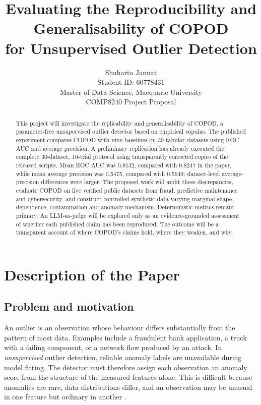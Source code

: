 \documentclass[11pt,a4paper,twocolumn]{article}
\title{\vspace{-1.2em}\textbf{Evaluating the Reproducibility and Generalisability of COPOD}\\
\textbf{for Unsupervised Outlier Detection}}
\author{Shuharto Jannat\\
Student ID: 60778431\\
Master of Data Science, Macquarie University\\
COMP8240 Project Proposal}
\date{}
\begin{document}
\maketitle
\vspace{-1.5em}

\begin{abstract}
This project will investigate the replicability and generalisability of COPOD, a parameter-free unsupervised outlier detector based on empirical copulas. The published experiment compares COPOD with nine baselines on 30 tabular datasets using ROC AUC and average precision. A preliminary replication has already executed the complete 30-dataset, 10-trial protocol using transparently corrected copies of the released scripts. Mean ROC AUC was 0.8132, compared with 0.8247 in the paper, while mean average precision was 0.5475, compared with 0.5649; dataset-level average-precision differences were larger. The proposed work will audit these discrepancies, evaluate COPOD on five verified public datasets from fraud, predictive maintenance and cybersecurity, and construct controlled synthetic data varying marginal shape, dependence, contamination and anomaly mechanism. Deterministic metrics remain primary. An LLM-as-judge will be explored only as an evidence-grounded assessment of whether each published claim has been reproduced. The outcome will be a transparent account of where COPOD's claims hold, where they weaken, and why.
\end{abstract}

\section{Description of the Paper}
\subsection{Problem and motivation}

An outlier is an observation whose behaviour differs substantially from the pattern of most data. Examples include a fraudulent bank application, a truck with a failing component, or a network flow produced by an attack. In \emph{unsupervised} outlier detection, reliable anomaly labels are unavailable during model fitting. The detector must therefore assign each observation an anomaly score from the structure of the measured features alone. This is difficult because anomalies are rare, data distributions differ, and an observation may be unusual in one feature but ordinary in another \citep{aggarwal2017}.
\end{document}
